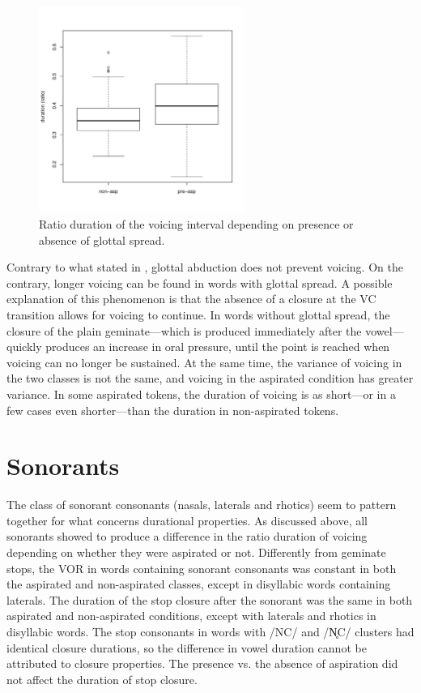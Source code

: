 \documentclass[11pt,a4paper,openany]{memoir}\usepackage[]{graphicx}\usepackage[]{color}
\newenvironment{knitrout}{}{} %
\begin{document}
\begin{figure}
\centering
\begin{knitrout}
\color{fgcolor}
\includegraphics[width=0.6\textwidth]{img/voic-stop-1} 

\end{knitrout}
\caption{Ratio duration of the voicing interval depending on presence or absence of glottal spread.}
\label{f:voicdur}
\end{figure}

Contrary to what stated in , glottal abduction does not prevent voicing.
On the contrary, longer voicing can be found in words with glottal spread.
A possible explanation of this phenomenon is that the absence of a closure at the VC transition allows for voicing to continue.
In words without glottal spread, the closure of the plain geminate---which is produced immediately after the vowel---quickly produces an increase in oral pressure, until the point is reached when voicing can no longer be sustained.
At the same time, the variance of voicing in the two classes is not the same, and voicing in the aspirated condition has greater variance.
In some aspirated tokens, the duration of voicing is as short---or in a few cases even shorter---than the duration in non-aspirated tokens.

\section{Sonorants}

The class of sonorant consonants (nasals, laterals and rhotics) seem to pattern together for what concerns durational properties.
As discussed above, all sonorants showed to produce a difference in the ratio duration of voicing depending on whether they were aspirated or not.
Differently from geminate stops, the VOR in words containing sonorant consonants was constant in both the aspirated and non-aspirated classes, except in disyllabic words containing laterals.
The duration of the stop closure after the sonorant was the same in both aspirated and non-aspirated conditions, except with laterals and rhotics in disyllabic words.
The stop consonants in words with /NC/ and /N̥C/ clusters had identical closure durations, so the difference in vowel duration cannot be attributed to closure properties.
The presence vs. the absence of aspiration did not affect the duration of stop closure.
\end{document}
